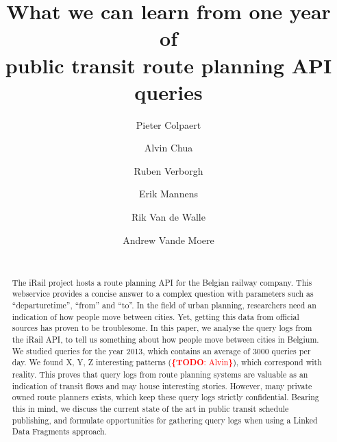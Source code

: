 \documentclass{sig-alternate}
\newcommand{\todo}[1]{\noindent\textcolor{red}{{\bf \{TODO}: #1{\bf \}}}}
\begin{document}
\title{What we can learn from one year of\\ public transit route planning API queries}
\author{
\alignauthor
Pieter Colpaert\\
\and
\alignauthor
Alvin Chua\\
\and
\alignauthor
Ruben Verborgh\\
\and
\alignauthor
Erik Mannens\\
\and
\alignauthor
Rik Van de Walle\\
\and
\alignauthor
Andrew Vande Moere\\
 \\
}

\maketitle
\begin{abstract}
The iRail project hosts a route planning API for the Belgian railway company.
This webservice provides a concise answer to a complex question with parameters such as ``departuretime'', ``from'' and ``to''.
In the field of urban planning, researchers need an indication of how people move between cities. 
Yet, getting this data from official sources has proven to be troublesome.
In this paper, we analyse the query logs from the iRail API, to tell us something about how people move between cities in Belgium.
We studied queries for the year 2013, which contains an average of 3000 queries per day.
We found X, Y, Z interesting patterns (\todo{Alvin}), which correspond with reality.
This proves that query logs from route planning systems are valuable as an indication of transit flows and may house interesting stories.
However, many private owned route planners exists, which keep these query logs strictly confidential.
Bearing this in mind, we discuss the current state of the art in public transit schedule publishing, and formulate opportunities for gathering query logs when using a Linked Data Fragments approach.

\end{abstract}
\end{document}
